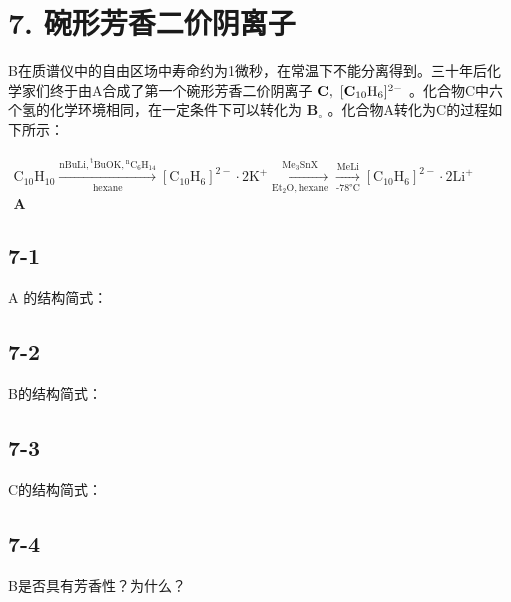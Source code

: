 \section*{7. 碗形芳香二价阴离子}
B在质谱仪中的⾃由区场中寿命约为1微秒，在常温下不能分离得到。三⼗年后化学家们终于由A合成了第⼀个碗形芳⾹⼆价阴离⼦ ${ \bf C } , ~ [ { \bf C } _ { 1 0 } \mathrm { H } _ { 6 } ] ^ { 2 - }$ 。化合物C中六个氢的化学环境相同，在⼀定条件下可以转化为 $\mathbf { B } _ { \circ }$ 。化合物A转化为C的过程如下所⽰：

$
\begin{array}{c} \mathrm{C} _ {1 0} \mathrm{H} _ {1 0} \xrightarrow [ \text {hexane} ]{\mathrm{nBuLi,} ^ {\mathrm{t}} \mathrm{BuOK,} ^ {\mathrm{n}} \mathrm{C} _ {6} \mathrm{H} _ {1 4}} [ \mathrm{C} _ {1 0} \mathrm{H} _ {6} ] ^ {2 -} \cdot 2 \mathrm{K} ^ {+} \xrightarrow [ \text {Et} _ {2} \mathrm{O} , \text {hexane} ]{\mathrm{Me} _ {3} \mathrm{SnX}} \xrightarrow [ \text {-78°C} ]{\mathrm{MeLi}} [ \mathrm{C} _ {1 0} \mathrm{H} _ {6} ] ^ {2 -} \cdot 2 \mathrm{Li} ^ {+} \\ \mathbf {A} \end{array}
$

\subsection*{7-1}
A 的结构简式：

\subsection*{7-2}
B的结构简式：

\subsection*{7-3}
C的结构简式：

\subsection*{7-4}
B是否具有芳⾹性？为什么？
